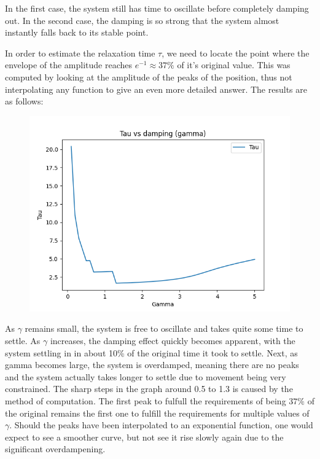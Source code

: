 \documentclass[a4paper,12pt]{article}
\begin{document}
In the first case, the system still has time to oscillate before completely damping out. In the second case, the 
damping is so strong that the system almost instantly falls back to its stable point.

In order to estimate the relaxation time $\tau$, we need to locate the point where the envelope of the amplitude
reaches $e^{-1} \approx 37\%$ of it's original value. This was computed by looking at the amplitude of the peaks of the position,
thus not interpolating any function to give an even more detailed answer. The results are as follows:

\begin{figure}[!ht]
  \centering
  \includegraphics[scale=0.6]{img/3-tau-gamma.png}
\end{figure}

\FloatBarrier

As $\gamma$ remains small, the system is free to oscillate and takes quite some time to settle. As $\gamma$ increases,
the damping effect quickly becomes apparent, with the system settling in in about 10\% of the original time it took
to settle. Next, as gamma becomes large, the system is overdamped, meaning there are no peaks and the system actually
takes longer to settle due to movement being very constrained. The sharp steps in the graph around 0.5 to 1.3 is
caused by the method of computation. The first peak to fulfull the requirements of being $37\%$ of the original
remains the first one to fulfill the requirements for multiple values of $\gamma$. Should the peaks have been
interpolated to an exponential function, one would expect to see a smoother curve, but not see it rise slowly again
due to the significant overdampening.
\end{document}
